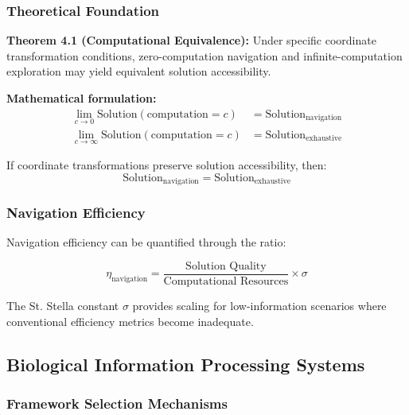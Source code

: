 \documentclass[11pt]{article}
\begin{document}
\subsubsection{Theoretical Foundation}

\textbf{Theorem 4.1 (Computational Equivalence):} Under specific coordinate transformation conditions, zero-computation navigation and infinite-computation exploration may yield equivalent solution accessibility.

\textbf{Mathematical formulation:}
\begin{align}
\lim_{c \to 0} \text{Solution}(\text{computation} = c) &= \text{Solution}_{\text{navigation}} \\
\lim_{c \to \infty} \text{Solution}(\text{computation} = c) &= \text{Solution}_{\text{exhaustive}}
\label{eq:computational_equivalence}
\end{align}

If coordinate transformations preserve solution accessibility, then:
\begin{equation}
\text{Solution}_{\text{navigation}} = \text{Solution}_{\text{exhaustive}}
\label{eq:navigation_exhaustive_equivalence}
\end{equation}

\subsubsection{Navigation Efficiency}

Navigation efficiency can be quantified through the ratio:

\begin{equation}
\eta_{\text{navigation}} = \frac{\text{Solution Quality}}{\text{Computational Resources}} \times \sigma
\label{eq:navigation_efficiency}
\end{equation}

The St. Stella constant $\sigma$ provides scaling for low-information scenarios where conventional efficiency metrics become inadequate.

\subsection{Biological Information Processing Systems}

\subsubsection{Framework Selection Mechanisms}
\end{document}
